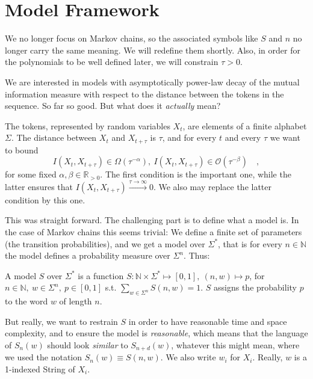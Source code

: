\documentclass[../../main.tex]{subfiles}
\begin{document}
\section{Model Framework}
    We no longer focus on Markov chains, so the associated symbols like $S$ and $n$ no longer carry the same meaning. We will redefine them shortly. Also, in order for the polynomials to be well defined later, we will constrain $\tau > 0$.

    We are interested in models with asymptotically power-law decay of the mutual information measure with respect to the distance between the tokens in the sequence. So far so good. But what does it \emph{actually} mean?

    The tokens, represented by random variables $X_t$, are elements of a finite alphabet $\Sigma$. The distance between $X_t$ and $X_{t + \tau}$ is $\tau$, and for every $t$ and every $\tau$ we want to bound
    \[
        I(X_t, X_{t + \tau}) \in \Omega(\tau^{-\alpha}), \ I(X_t, X_{t + \tau}) \in \mathcal{O}(\tau^{-\beta}) \quad ,
    \]
    for some fixed $\alpha, \beta \in \mathbb{R}_{>0}$. The first condition is the important one, while the latter ensures that $I(X_t, X_{t + \tau}) \xrightarrow{\tau \to \infty} 0$. We also may replace the latter condition by this one.

    This was straight forward. The challenging part is to define what a  model is. In the case of Markov chains this seems trivial: We define a finite set of parameters (the transition probabilities), and we get a model over $\Sigma^*$, that is for every $n \in \mathbb{N}$ the model defines a probability measure over $\Sigma^n$. Thus:

    \begin{definition}
        A model $S$ over $\Sigma^*$ is a function $S: \mathbb{N} \times \Sigma^* \mapsto [0, 1], \ (n, w) \mapsto p$, for $n \in \mathbb{N}, \ w \in \Sigma^n, \ p \in [0, 1]$ s.t. $\sum_{w \in \Sigma^n} S(n, w) = 1$. $S$ assigns the probability $p$ to the word $w$ of length $n$.
    \end{definition}

    But really, we want to restrain $S$ in order to have reasonable time and space complexity, and to ensure the model is \emph{reasonable}, which means that the language of $S_n(w)$ should look \emph{similar} to $S_{n + d}(w)$, whatever this might mean, where we used the notation $S_n(w) \equiv S(n, w)$. We also write $w_i$ for $X_i$. Really, $w$ is a 1-indexed String of $X_i$.  
\end{document}
